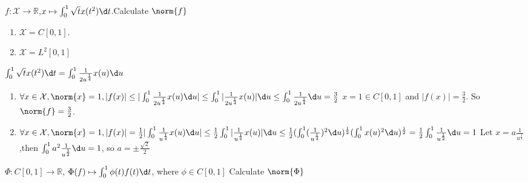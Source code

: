 \documentclass{ctexart}
\begin{document}
\begin{problem}
    $f: \mathcal{X}\to \mathbb{R}$,$x\mapsto\int_0^1\sqrt{t} x(t^2)\d t$.Calculate $\norm{f}$
    \begin{enumerate}
        \item $\mathcal{X}=C[0,1]$.
        \item \(\mathcal{X}=L^2[0,1]\)
    \end{enumerate}
\end{problem}
\begin{solution}
   \(\int_{0}^{1} \sqrt{t} x(t^2) \d t=\int_{0}^{1} \frac{1}{2u^{\frac{1}{4}}} x(u) \d u  \) 
  \begin{enumerate}
    \item \(\forall x \in \mathcal{X}, \norm{x} = 1, |f(x)| \leq | \int_{0}^{1} \frac{1}{2u^{\frac{1}{4}}} x(u) \d u| \leq \int_{0}^{1} |\frac{1}{2u^{\frac{1}{4}}} x(u)| \d u \leq \int_{0}^{1} \frac{1}{2u^{\frac{1}{4}}} \d u= \frac{3}{2}\)
      \(x=1 \in C[0,1]\) and \(|f(x)|=\frac{3}{2}\). So \(\norm{f}=\frac{3}{2}\).
    \item \(\forall x \in \mathcal{X} , \norm{x}=1, |f(x)|=\frac{1}{2} |\int_{0}^{1} \frac{1}{u^{\frac{1}{4}}} x(u) \d u|
      \leq \frac{1}{2} \int_{0}^{1} |\frac{1}{u^{\frac{1}{4}}}x(u)| \d u
      \leq \frac{1}{2} (\int_{0}^{1} (\frac{1}{u^{\frac{1}{4}}})^2 \d u)^{\frac{1}{2}}(\int_{0}^{1} x(u)^{2} \d u)^{\frac{1}{2}} 
      = \frac{1}{2} \int_{0}^{1} \frac{1}{u^{\frac{1}{2}}} \d u = 1\)
      Let \(x=a \frac{1}{u^{\frac{1}{4}}}\) ,then \(\int_{0}^{1} a^{2} \frac{1}{u^{\frac{1}{2}}} \d u = 1\), so \(a= \pm \frac{\sqrt{2}}{2}\) 
  \end{enumerate}
\end{solution}

\begin{problem}
    $\Phi: C[0,1]\to \mathbb{R}$, $\Phi(f)\mapsto \int_0^1\phi(t)f(t)\d t$, where $\phi\in C[0,1]$ Calculate $\norm{\Phi}$
\end{problem}
\end{document}
